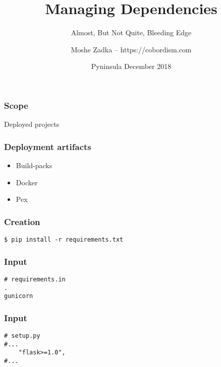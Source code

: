 \usepackage[utf8]{inputenc}
\usepackage{listings}
\usepackage{textcomp}
\usepackage{fancyvrb}

\title{Managing Dependencies}
\subtitle{Almost, But Not Quite, Bleeding Edge}
\author{Moshe Zadka -- https://cobordism.com}
\date{Pyninsula December 2018}
 

 
\begin{titlepage}
\maketitle
\end{titlepage}

\frame{\titlepage}

\begin{frame}[fragile]
\frametitle{Scope}

Deployed projects
\end{frame}

\begin{frame}[fragile]
\frametitle{Deployment artifacts}

\begin{itemize}
\item Build-packs
\item Docker
\item Pex
\end{itemize}

\end{frame}

\begin{frame}[fragile]
\frametitle{Creation}

\begin{lstlisting}
$ pip install -r requirements.txt
\end{lstlisting}

\end{frame}

\begin{frame}[fragile]
\frametitle{Input}

\begin{lstlisting}
# requirements.in
.
gunicorn
\end{lstlisting}

\end{frame}


\begin{frame}[fragile]
\frametitle{Input}

\begin{lstlisting}
# setup.py
#...
    "flask>=1.0",
#...
\end{lstlisting}

\end{frame}

